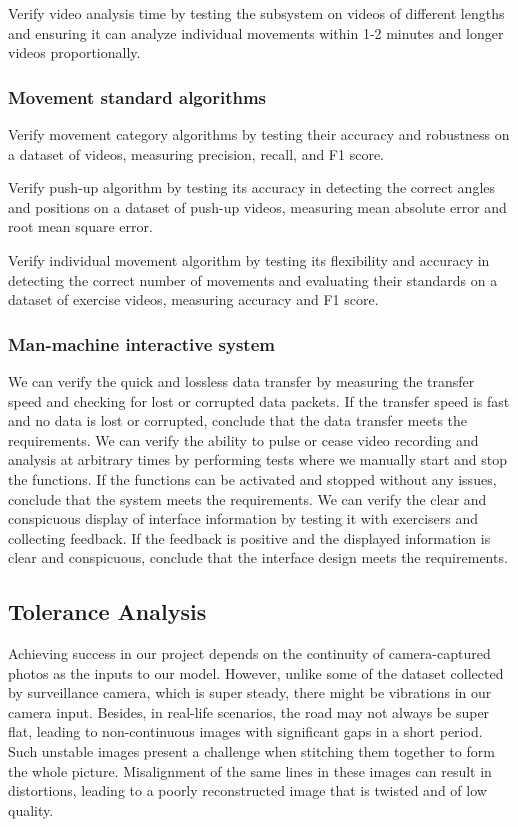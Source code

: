 Verify video analysis time by testing the subsystem on videos of different lengths and ensuring it can analyze individual movements within 1-2 minutes and longer videos proportionally.
\subsubsection{Movement standard algorithms}
Verify movement category algorithms by testing their accuracy and robustness on a dataset of videos, measuring precision, recall, and F1 score.

Verify push-up algorithm by testing its accuracy in detecting the correct angles and positions on a dataset of push-up videos, measuring mean absolute error and root mean square error.

Verify individual movement algorithm by testing its flexibility and accuracy in detecting the correct number of movements and evaluating their standards on a dataset of exercise videos, measuring accuracy and F1 score.
\subsubsection{Man-machine interactive system}
We can verify the quick and lossless data transfer by measuring the transfer speed and checking for lost or corrupted data packets. If the transfer speed is fast and no data is lost or corrupted, conclude that the data transfer meets the requirements.
We can verify the ability to pulse or cease video recording and analysis at arbitrary times by performing tests where we manually start and stop the functions. If the functions can be activated and stopped without any issues, conclude that the system meets the requirements.
We can verify the clear and conspicuous display of interface information by testing it with exercisers and collecting feedback. If the feedback is positive and the displayed information is clear and conspicuous, conclude that the interface design meets the requirements.


\subsection{Tolerance Analysis}
Achieving success in our project depends on the continuity of camera-captured photos as the inputs to our model. However, unlike some of the dataset collected by surveillance camera, which is super steady, there might be vibrations in our camera input. Besides, in real-life scenarios, the road may not always be super flat, leading to non-continuous images with significant gaps in a short period. Such unstable images present a challenge when stitching them together to form the whole picture. Misalignment of the same lines in these images can result in distortions, leading to a poorly reconstructed image that is twisted and of low quality.

